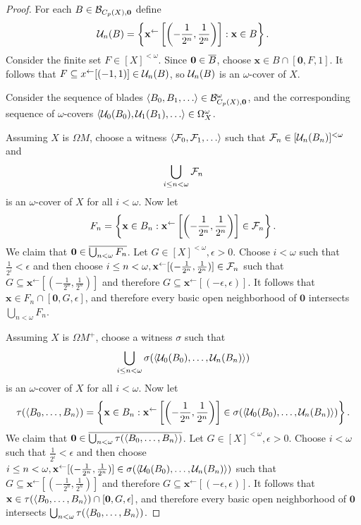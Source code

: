 \documentclass{amsart}
\renewcommand{\vec}{\mathbf}
\theoremstyle{plain}
\theoremstyle{definition}
\theoremstyle{remark}
\theoremstyle{plain}
\theoremstyle{definition}
\theoremstyle{remark}
\begin{document}
\begin{proof}
  For each \(B\in\mc B_{C_p(X),\vec 0}\) define
  \[
    \mc U_n(B)
      =
    \left\{
      \vec x^{\leftarrow}\left[\left(-\frac{1}{2^n},\frac{1}{2^n}\right)\right]
    :
      \vec x\in B
    \right\}
  .\]
  Consider the finite set \(F\in[X]^{<\omega}\). Since
  \(\vec 0\in\cl B\), choose \(\vec x\in B\cap[\vec 0,F,1]\).
  It follows that \(F\subseteq x^{\leftarrow}[(-1,1)]\in\mathcal{U}_n(B)\),
  so \(\mathcal{U}_n(B)\) is an \(\omega\)-cover of \(X\).

  Consider the sequence of blades
  \(\<B_0,B_1,\dots\>\in\mc B_{C_p(X),\vec 0}^\omega\), and the
  corresponding sequence of \(\omega\)-covers
  \(\<\mc U_0(B_0),\mc U_1(B_1),\dots\>\in \Omega_X^\omega\).

  Assuming \(X\) is \(\Omega M\), choose a witness
  \(\<\mc F_0,\mc F_1,\dots\>\) such that
  \(\mathcal{F}_n\in[\mathcal{U}_n(B_n)]^{<\omega}\) and
  \[
    \bigcup_{i\leq n<\omega} \mathcal{F}_n
  \]
  is an \(\omega\)-cover of \(X\) for all \(i<\omega\).
  Now let
  \[
    F_n
      =
    \left\{
      \vec x\in B_n
    :
      \vec x^{\leftarrow}\left[\left(-\frac{1}{2^n},\frac{1}{2^n}\right)\right]
        \in
      \mc F_n
    \right\}
  .\]
  We claim that \(\vec 0\in\cl{\bigcup_{n<\omega}F_n}\).
  Let \(G\in[X]^{<\omega},\epsilon>0\). Choose \(i<\omega\) such that
  \(\frac{1}{2^i}<\epsilon\) and then choose
  \(i\leq n<\omega,\vec x^{\leftarrow}[(-\frac{1}{2^n},\frac{1}{2^n})]\in\mc F_n\)
  such that \(G\subseteq \vec x^{\leftarrow}[(-\frac{1}{2^n},\frac{1}{2^n})]\)
  and therefore \(G\subseteq \vec x^{\leftarrow}[(-\epsilon,\epsilon)]\).
  It follows that \(\vec x\in F_n\cap[\vec 0,G,\epsilon]\), and therefore
  every basic open neighborhood of \(\vec 0\) intersects
  \(\bigcup_{n<\omega}F_n\).

  Assuming \(X\) is \(\Omega M^+\), choose a witness
  \(\sigma\) such that
  \[
    \bigcup_{i\leq n<\omega} \sigma(\langle\mathcal{U}_0(B_0),\dots,\mathcal{U}_n(B_n)\rangle)
  \]
  is an \(\omega\)-cover of \(X\) for all \(i<\omega\).
  Now let
  \[
    \tau(\<B_0,\dots,B_n\>)
      =
    \left\{
      \vec x\in B_n
    :
      \vec x^{\leftarrow}\left[\left(-\frac{1}{2^n},\frac{1}{2^n}\right)\right]
        \in
      \sigma(\<\mc U_0(B_0),\dots,\mc U_n(B_n)\>)
    \right\}
  .\]
  We claim that \(\vec 0\in\cl{\bigcup_{n<\omega}\tau(\<B_0,\dots,B_n\>)}\).
  Let \(G\in[X]^{<\omega},\epsilon>0\). Choose \(i<\omega\) such that
  \(\frac{1}{2^i}<\epsilon\) and then choose
  \(i\leq n<\omega,\vec x^{\leftarrow}[(-\frac{1}{2^n},\frac{1}{2^n})]\in\sigma(\<\mc U_0(B_0),\dots,\mc U_n(B_n)\>)\)
  such that \(G\subseteq \vec x^{\leftarrow}[(-\frac{1}{2^n},\frac{1}{2^n})]\)
  and therefore \(G\subseteq \vec x^{\leftarrow}[(-\epsilon,\epsilon)]\).
  It follows that \(\vec x\in \tau(\<B_0,\dots,B_n\>)\cap[\vec 0,G,\epsilon]\), and therefore
  every basic open neighborhood of \(\vec 0\) intersects
  \(\bigcup_{n<\omega}\tau(\langle B_0,\dots,B_n\rangle)\).


\end{proof}
\end{document}
